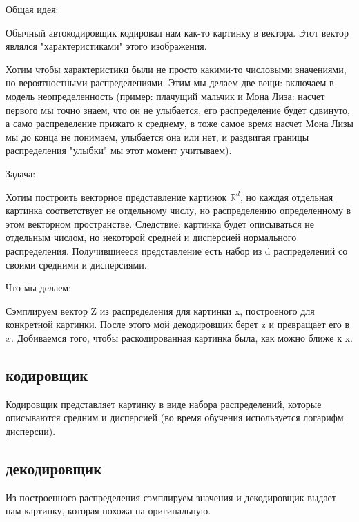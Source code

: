 
	
	Общая идея: 
	
	Обычный автокодировщик кодировал нам как-то картинку в вектора. Этот вектор являлся "характеристиками" этого изображения. 
	
	Хотим чтобы характеристики были не просто какими-то числовыми значениями, но вероятностными распределениями. Этим мы делаем две вещи: включаем в модель неопределенность (пример: плачущий мальчик и Мона Лиза: насчет первого мы точно знаем, что он не улыбается, его распределение будет сдвинуто, а само распределение прижато к среднему, в тоже самое время насчет Мона Лизы мы до конца не понимаем, улыбается она или нет, и раздвигая границы распределения "улыбки" мы этот момент учитываем). 
	
	Задача:
	
	Хотим построить векторное представление картинок $\mathbb{R}^{d}$, но каждая отдельная картинка соответствует не отдельному числу, но распределению определенному в этом векторном пространстве. Следствие: картинка будет описываться не отдельным числом, но некоторой средней и дисперсией нормального распределения. Получившиееся представление есть набор из d распределений со своими средними и дисперсиями. 
	
	Что мы делаем: 
	
	Сэмплируем вектор Z из распределения для картинки x, построеного для конкретной картинки. После этого мой декодировщик берет z и превращает его в $\bar x$.  Добиваемся того, чтобы раскодированная картинка была, как можно ближе к x.
	
	
	\subsection{кодировщик}
	
	Кодировщик представляет картинку в виде набора распределений, которые описываются средним и дисперсией (во время обучения используется логарифм дисперсии). 

	
	\subsection{декодировщик}
	
	Из построенного распределения сэмплируем значения и декодировщик выдает нам картинку, которая похожа на оригинальную. 
